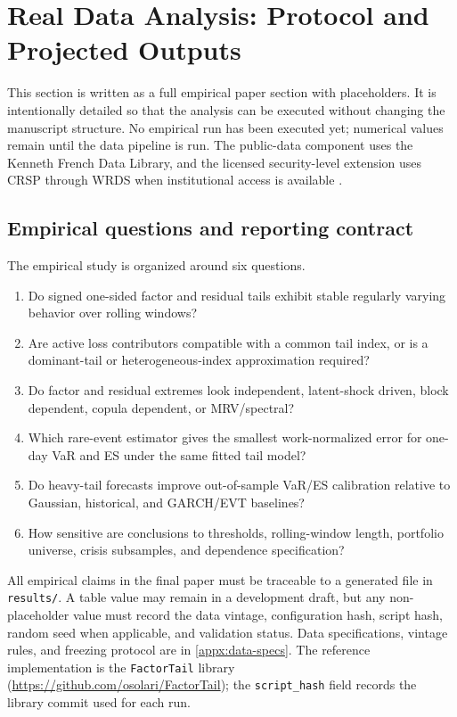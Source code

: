 \section{Real Data Analysis: Protocol and Projected Outputs}
\label{sec:real-data}

This section is written as a full empirical paper section with placeholders. It
is intentionally detailed so that the analysis can be executed without changing
the manuscript structure. No empirical run has been executed yet; numerical
values remain \xx{} until the data pipeline is run. The public-data component
uses the Kenneth French Data Library, and the licensed security-level
extension uses CRSP through WRDS when institutional access is available
\citep{FrenchDataLibrary2026,CRSPGuide2026}.

\subsection{Empirical questions and reporting contract}

The empirical study is organized around six questions.
\begin{enumerate}[label=Q\arabic*.]
\item Do signed one-sided factor and residual tails exhibit stable regularly
varying behavior over rolling windows?
\item Are active loss contributors compatible with a common tail index, or is a
dominant-tail or heterogeneous-index approximation required?
\item Do factor and residual extremes look independent, latent-shock driven,
block dependent, copula dependent, or MRV/spectral?
\item Which rare-event estimator gives the smallest work-normalized error for
one-day VaR and ES under the same fitted tail model?
\item Do heavy-tail forecasts improve out-of-sample VaR/ES calibration relative
to Gaussian, historical, and GARCH/EVT baselines?
\item How sensitive are conclusions to thresholds, rolling-window length,
portfolio universe, crisis subsamples, and dependence specification?
\end{enumerate}

All empirical claims in the final paper must be traceable to a generated file
in \texttt{results/}. A table value may remain \xx{} in a development draft,
but any non-placeholder value must record the data vintage, configuration
hash, script hash, random seed when applicable, and validation status. Data
specifications, vintage rules, and freezing protocol are in
\cref{appx:data-specs}. The reference implementation is the
\texttt{FactorTail} library
(\url{https://github.com/osolari/FactorTail}); the
\texttt{script\_hash} field records the library commit used for each run.

